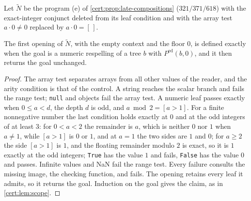 Let $\widetilde N$ be the program (e) of \cref{cert:prop:late-compositions}
($321/371/618$) with the exact-integer conjunct deleted from its leaf
condition and with the array test $a\cdot 0\neq 0$ replaced by $a\cdot 0=[\,]$.

\begin{lemma}\label{cert:lem:tolerant-goal}
The first opening of $\widetilde N$, with the empty context and the floor $0$,
is defined exactly when the goal is a numeric respelling of a tree $b$ with
$P^{\mathrm{ed}}(b,0)$, and it then returns the goal unchanged.
\end{lemma}
\begin{proof}
The array test separates arrays from all other values of the reader, and the
arity condition is that of the control. A string reaches the scalar branch and
fails the range test; \texttt{null} and objects fail the array test. A numeric
leaf passes exactly when $0\le a<d$, the depth $d$ is odd, and
$a\bmod 2=[a>1]$. For a finite nonnegative number the last condition holds
exactly at $0$ and at the odd integers of at least $3$: for $0<a<2$ the
remainder is $a$, which is neither $0$ nor $1$ when $a\neq 1$, while $[a>1]$ is
$0$ or $1$, and at $a=1$ the two sides are $1$ and $0$; for $a\ge 2$ the side
$[a>1]$ is $1$, and the floating remainder modulo $2$ is exact, so it is $1$
exactly at the odd integers; \texttt{True} has the value $1$ and fails,
\texttt{False} has the value $0$ and passes. Infinite values and NaN fail the range test. Every
failure consults the missing image, the checking function, and fails. The
opening retains every leaf it admits, so it returns the goal. Induction on the
goal gives the claim, as in \cref{cert:lem:scope}.
\end{proof}

